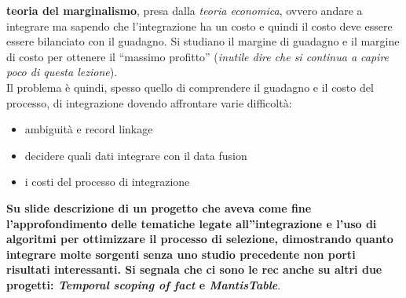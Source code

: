 \documentclass[a4paper,12pt, oneside]{book}
\begin{document}
\textbf{teoria del marginalismo}, presa dalla \textit{teoria economica}, ovvero
andare a integrare ma sapendo che l'integrazione ha un costo e quindi il costo
deve essere essere bilanciato con il guadagno. Si studiano il margine di
guadagno e il margine di costo per ottenere il ``massimo profitto''
(\textit{inutile dire che si continua a capire poco di questa lezione}).\\
Il problema è quindi, spesso quello di comprendere il guadagno e il costo del
processo, di integrazione dovendo affrontare varie difficoltà:
\begin{itemize}
  \item ambiguità e record linkage
  \item decidere quali dati integrare con il data fusion
  \item i costi del processo di integrazione
\end{itemize}
\textbf{Su slide descrizione di un progetto che aveva come fine
  l'approfondimento delle tematiche legate all''integrazione e l'uso di
  algoritmi per ottimizzare il processo di selezione, dimostrando quanto
  integrare molte sorgenti senza uno studio precedente non porti risultati
  interessanti. Si segnala che ci sono le
  rec anche su altri due progetti: \textit{Temporal scoping of fact} e
  \textit{MantisTable}}. 
\end{document}
